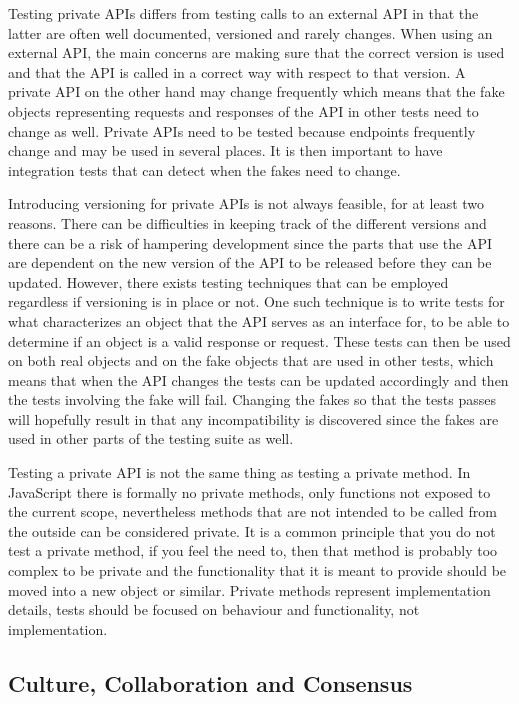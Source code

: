 \documentclass[11pt]{article}
\begin{document}
Testing private APIs differs from testing calls to an external API in that the latter are often well documented, versioned and rarely changes. When using an external API, the main concerns are making sure that the correct version is used and that the API is called in a correct way with respect to that version. A private API on the other hand may change frequently which means that the fake objects representing requests and responses of the API in other tests need to change as well. Private APIs need to be tested because endpoints frequently change and may be used in several places. It is then important to have integration tests that can detect when the fakes need to change. \cite[questions~34,~36]{Edelstam}

Introducing versioning for private APIs is not always feasible, for at least two reasons. There can be difficulties in keeping track of the different versions and there can be a risk of hampering development since the parts that use the API are dependent on the new version of the API to be released before they can be updated. However, there exists testing techniques that can be employed regardless if versioning is in place or not. One such technique is to write tests for what characterizes an object that the API serves as an interface for, to be able to determine if an object is a valid response or request. These tests can then be used on both real objects and on the fake objects that are used in other tests, which means that when the API changes the tests can be updated accordingly and then the tests involving the fake will fail. Changing the fakes so that the tests passes will hopefully result in that any incompatibility is discovered since the fakes are used in other parts of the testing suite as well. \cite[question~34]{Edelstam}

Testing a private API is not the same thing as testing a private method. In JavaScript there is formally no private methods, only functions not exposed to the current scope, nevertheless methods that are not intended to be called from the outside can be considered private. It is a common principle that you do not test a private method, if you feel the need to, then that method is probably too complex to be private and the functionality that it is meant to provide should be moved into a new object or similar. Private methods represent implementation details, tests should be focused on behaviour and functionality, not implementation. \cite[questions~62-63]{Edelstam}

\subsection{Culture, Collaboration and Consensus}
\label{sec:ccc}
\end{document}
